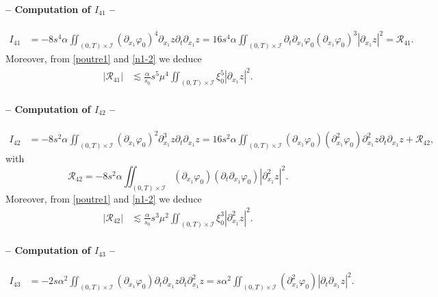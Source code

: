 \documentclass[a4paper, 12pt]{article}
\theoremstyle{plain}
\theoremstyle{definition}
\numberwithin{theorem}{section}
\numberwithin{equation}{section}
\begin{document}
{\paragraph{-- Computation of $I_{41}$ --}
\begin{align*}
I_{41}&=-8s^4\alpha\iint_{(0,T)\times\mathcal{I}}(\partial_{x_1}\varphi_0)^4\partial_{x_1}z\partial_t\partial_{x_1}z=16s^4\alpha\iint_{(0,T)\times\mathcal{I}}\partial_t\partial_{x_1}\varphi_0(\partial_{x_1}\varphi_0)^3|\partial_{x_1}z|^2=\mathcal{R}_{41}.
\end{align*}
Moreover, from \eqref{poutre1} and \eqref{n1-2} we deduce
\begin{align}
|\mathcal{R}_{41}|&\lesssim \frac{\alpha}{s_0}s^5\mu^4\iint_{(0,T)\times\mathcal{I}}\xi_0^5|\partial_{x_1}z|^2.\label{EstI41}
\end{align}
\paragraph{-- Computation of $I_{42}$ --}
\begin{align*}
I_{42}&=-8s^2\alpha\iint_{(0,T)\times\mathcal{I}}(\partial_{x_1}\varphi_0)^2\partial^3_{x_1}z\partial_t\partial_{x_1}z=16s^2\alpha\iint_{(0,T)\times\mathcal{I}}(\partial_{x_1}\varphi_0)(\partial^2_{x_1}\varphi_0)\partial^2_{x_1}z\partial_t\partial_{x_1}z+\mathcal{R}_{42},
\end{align*}
with 
$$\mathcal{R}_{42}=-8s^2\alpha\iint_{(0,T)\times\mathcal{I}}(\partial_{x_1}\varphi_0)(\partial_t\partial_{x_1}\varphi_0)|\partial^2_{x_1}z|^2.$$
Moreover, from \eqref{poutre1} and \eqref{n1-2} we deduce
\begin{align}
|\mathcal{R}_{42}|&\lesssim \frac{\alpha}{s_0}s^3\mu^2\iint_{(0,T)\times\mathcal{I}}\xi_0^3|\partial^2_{x_1}z|^2.\label{EstR42}
\end{align}
\paragraph{-- Computation of $I_{43}$ --}
\begin{align*}
I_{43}&=-2s\alpha^2\iint_{(0,T)\times\mathcal{I}}(\partial_{x_1}\varphi_0)\partial_t\partial_{x_1}z\partial_t\partial^2_{x_1}z=s\alpha^2\iint_{(0,T)\times\mathcal{I}}(\partial^2_{x_1}\varphi_0)|\partial_t\partial_{x_1}z|^2.
\end{align*}
}
\end{document}
